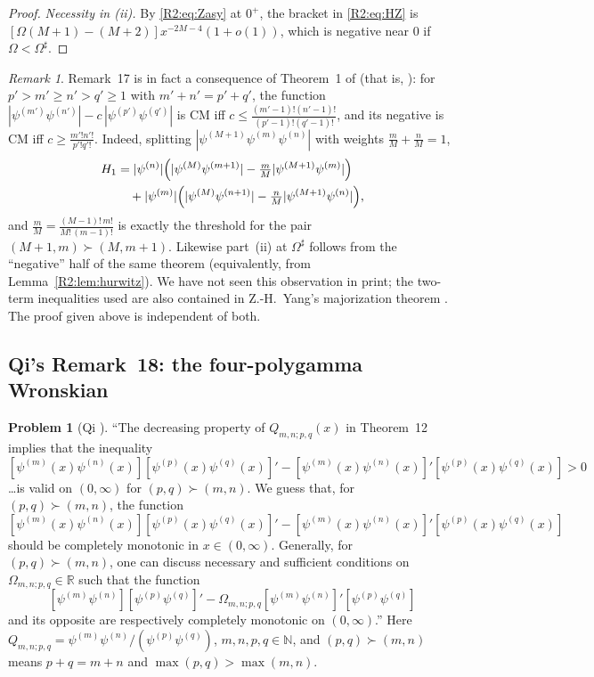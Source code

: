 \documentclass[11pt]{amsart}
\theoremstyle{definition}
\newtheorem{problem}[theorem]{Problem}
\theoremstyle{remark}
\newtheorem{remark}[theorem]{Remark}
\begin{document}
\begin{proof}
\emph{Necessity in (ii).} By \eqref{R2:eq:Zasy} at $0^+$, the bracket in
\eqref{R2:eq:HZ} is $[\Omega(M+1)-(M+2)]x^{-2M-4}(1+o(1))$, which is negative
near $0$ if $\Omega<\Omega^\sharp$.
\end{proof}

\begin{remark}\label{R2:rem:A-split}
Remark~17 is in fact a consequence of Theorem~1 of \cite{R2-QiCR2022}
(that is, \cite[Thm.~3.1]{R2-QiRM2021}): for $p'>m'\ge n'>q'\ge1$ with
$m'+n'=p'+q'$, the function
$|\psi^{(m')}\psi^{(n')}|-c\,|\psi^{(p')}\psi^{(q')}|$ is CM iff
$c\le\frac{(m'-1)!(n'-1)!}{(p'-1)!(q'-1)!}$, and its negative is CM iff
$c\ge\frac{m'!n'!}{p'!q'!}$. Indeed, splitting
$|\psi^{(M+1)}\psi^{(m)}\psi^{(n)}|$ with weights $\frac mM+\frac nM=1$,
\begin{align*}
 H_1&=|\psi^{(n)}|\Bigl(|\psi^{(M)}\psi^{(m+1)}|-\tfrac mM|\psi^{(M+1)}\psi^{(m)}|\Bigr)\\
 &\quad+|\psi^{(m)}|\Bigl(|\psi^{(M)}\psi^{(n+1)}|-\tfrac nM|\psi^{(M+1)}\psi^{(n)}|\Bigr),
\end{align*}
and $\frac mM=\frac{(M-1)!\,m!}{M!\,(m-1)!}$ is exactly the threshold for
the pair $(M+1,m)\succ(M,m+1)$. Likewise part~(ii) at $\Omega^\sharp$
follows from the ``negative'' half of the same theorem (equivalently, from
Lemma~\ref{R2:lem:hurwitz}). We have not seen this observation in print; the
two-term inequalities used are also contained in Z.-H.~Yang's majorization
theorem \cite[Prop.~2]{R2-Yang2025}. The proof given above is independent of
both.
\end{remark}

\subsection{Qi's Remark~18: the four-polygamma Wronskian}
\label{R2:subsec:B}

\begin{problem}[{Qi \cite[Remark~18]{R2-QiCR2022}}]\label{R2:prob:B}
``The decreasing property of $Q_{m,n;p,q}(x)$ in Theorem~12 implies that the
inequality
\[
 [\psi^{(m)}(x)\psi^{(n)}(x)][\psi^{(p)}(x)\psi^{(q)}(x)]'
 -[\psi^{(m)}(x)\psi^{(n)}(x)]'[\psi^{(p)}(x)\psi^{(q)}(x)]>0
\]
\dots is valid on $(0,\infty)$ for $(p,q)\succ(m,n)$. We guess that, for
$(p,q)\succ(m,n)$, the function
\[
 [\psi^{(m)}(x)\psi^{(n)}(x)][\psi^{(p)}(x)\psi^{(q)}(x)]'
 -[\psi^{(m)}(x)\psi^{(n)}(x)]'[\psi^{(p)}(x)\psi^{(q)}(x)]
\]
should be completely monotonic in $x\in(0,\infty)$. Generally, for
$(p,q)\succ(m,n)$, one can discuss necessary and sufficient conditions on
$\Omega_{m,n;p,q}\in\mathbb R$ such that the function
\[
 [\psi^{(m)}\psi^{(n)}][\psi^{(p)}\psi^{(q)}]'
 -\Omega_{m,n;p,q}[\psi^{(m)}\psi^{(n)}]'[\psi^{(p)}\psi^{(q)}]
\]
and its opposite are respectively completely monotonic on $(0,\infty)$.''
Here $Q_{m,n;p,q}=\psi^{(m)}\psi^{(n)}/(\psi^{(p)}\psi^{(q)})$,
$m,n,p,q\in\mathbb N$, and $(p,q)\succ(m,n)$ means $p+q=m+n$ and
$\max(p,q)>\max(m,n)$.
\end{problem}
\end{document}

